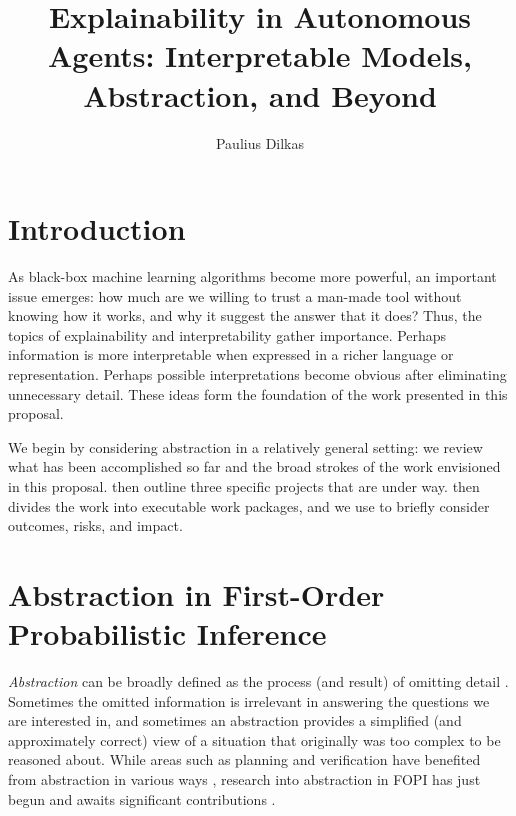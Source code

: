\documentclass{article}
\begin{document}
\title{Explainability in Autonomous Agents: Interpretable Models, Abstraction,
  and Beyond}
\author{Paulius Dilkas}
\maketitle

\section{Introduction}

As black-box machine learning algorithms become more powerful, an important
issue emerges: how much are we willing to trust a man-made tool without knowing
how it works, and why it suggest the answer that it does? Thus, the topics of
explainability and interpretability gather importance. Perhaps information is
more interpretable when expressed in a richer language or representation.
Perhaps possible interpretations become obvious after eliminating unnecessary
detail. These ideas form the foundation of the work presented in this proposal.

We begin by considering abstraction in a relatively general setting: we
review what has been accomplished so far and the broad strokes of the work
envisioned in this proposal.  then outline three
specific projects that are under way.  then divides the
work into executable work packages, and we use  to
briefly consider outcomes, risks, and impact.

\section{Abstraction in First-Order Probabilistic Inference}

\emph{Abstraction} can be broadly defined as the process (and result) of
omitting detail \cite{doi:10.1086/670300}. Sometimes the omitted information is
irrelevant in answering the questions we are interested in, and sometimes an
abstraction provides a simplified (and approximately correct) view of a
situation that originally was too complex to be reasoned about. While areas such
as planning and verification have benefited from abstraction in various ways
\cite{saitta2013abstraction}, research into abstraction in FOPI has just begun
and awaits significant contributions
\cite{DBLP:journals/corr/abs-1810-02434,DBLP:conf/icml/HoltzenBM18,DBLP:conf/uai/HoltzenMB17}.
\end{document}
